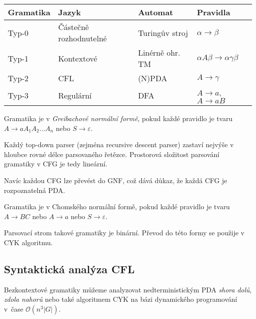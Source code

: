 
\begin{longtable}[]{llll}
\toprule
Gramatika & Jazyk & Automat & Pravidla \tabularnewline
\midrule
\endhead
Typ-0 & Částečně rozhodnutelné & Turingův stroj & $\alpha \rightarrow \beta$ \tabularnewline
Typ-1 & Kontextové & Linérně ohr. TM & $\alpha A \beta \rightarrow \alpha \gamma \beta$ \tabularnewline
Typ-2 & CFL & (N)PDA &	$ A\rightarrow \gamma$ \tabularnewline
Typ-3 & Regulární & DFA & $A \rightarrow a$, $A \rightarrow aB$ \tabularnewline
\bottomrule
\end{longtable}


\bigskip

\begin{definition}
    Gramatika je v {\em Greibachové normální formě}, pokud
    každé pravidlo je tvaru
    $A \to a A_1 A_2 \ldots A_n$ nebo $S \to \varepsilon$.
\end{definition}

Každý top-down parser (zejména recursive descent parser)
zastaví nejvýše v hloubce rovné délce parsovaného řetězce. Prostorová
složitost parsování gramatiky v CFG je tedy lineární.

Navíc každou CFG lze převést do GNF, což dává důkaz, že každá CFG je
rozpoznatelná PDA.

\begin{definition}
    Gramatika je v Chomského normální formě, pokud každé pravidlo je
    tvaru $A \to BC$ nebo $A \to a$ nebo $S \to \varepsilon$.
\end{definition}

Parsovací strom takové gramatiky je binární. Převod do této formy se
použije v CYK algoritmu.


\subsection{Syntaktická analýza CFL}

Bezkontextové gramatiky můžeme analyzovat nedterministickým PDA
{\em shora dolů}, {\em zdola nahorů} nebo také algoritmem CYK na bázi
dynamického programování v~čase $\mathcal{O}(n^3 \lvert G \rvert)$.

